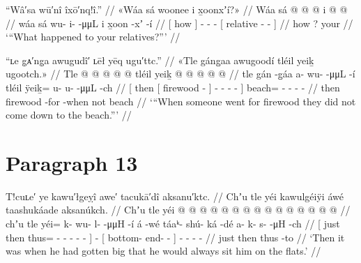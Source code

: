 \ex\label{ex:91-145-what-happen-relatives}%
%
\begingl
	\glpreamble	“Wâ′sa wū′nî îxō′nq!î.” //
	\glpreamble	«\!Wáa sá woonee i x̱oonxʼí?\!» //
	\gla	{} Wáa sá {}  @ {} @ {} @ {}
		{} i  @ {} @ {} {} //
	\glb	{} wáa sá {} wu- i-  -μμL
		{} i x̱oon -xʼ -í {} //
	\glc	{}[ how  {}] - -  -
		{}[  relative - - {}] //
	\gld	{} how ? {}  {} {} {}
		{} your  {} {} {} //
	\glft	‘“What happened to your relatives?”’
		//
\endgl
\xe

\ex\label{ex:91-146-when-go-for-wood-not-go-beach}%
%
\begingl
	\glpreamble	“ʟe g̣ᴀ′ng̣a awugudî′ ʟēł yēq ugu′ttc.” //
	\glpreamble	«\!Tle gáng̱aa awugoodí tléil yeiḵ ugootch.\!» //
	\gla	{} Tle {}  @ {} {}
			 @ {} @ {} @ {} @ {} {}
		tléil yeiḵ @  @ {} @ {} @ {} @ {} //
	\glb	{} tle {} gán -g̱áa {}
			a- wu-  -μμL -í {}
		tléil ÿeiḵ= u- u-  -μμL -ch //
	\glc	{}[ then {}[ firewood - {}]
			- -  - - {}]
		 beach= - -  - - //
	\gld	{} then {} firewood -for {}
			 {} {} {} -when {}
		not beach  {} {} {} {} //
	\glft	‘“When someone went for firewood they did not come down to the beach.”’
		//
\endgl
\xe

\section{Paragraph 13}\label{sec:91-para-13}

\ex\label{ex:91-147-gotten-big-sit-on-flats}%
%
\begingl
	\glpreamble	T!cuʟe′ ye kawu′łgeỵî awe′ tacukā′dî aksanu′ktc. //
	\glpreamble	Chʼu tle yéi kawulgéiÿi áwé taashukáade aksanúkch. //
	\gla	{} Chʼu tle yéi @  @ {} @ {} @ {} @ {} @ {} {}
		 @ {}
		{}  @ {} @ {} @ {} {}
		 @ {} @ {} @ {} @ {} @ {} //
	\glb	{} chʼu tle yéi= k- wu- l-  -μμH -í {}
		á -wé
		{} táaᵏ- shú- ká -dé {}
		a- k- s-  -μH -ch //
	\glc	{}[ just then
			thus= - - -  - - {}]
		 -
		{}[ bottom- end-  - {}]
		- - -  - //
	\gld	{} just then thus  {} {} {} {} {} {}
		 {}
		{}  {} {} -to {}
		 {} {} {} {} {} //
	\glft	‘Then it was when he had gotten big that he would always sit him on the flats.’
		//
\endgl
\xe

